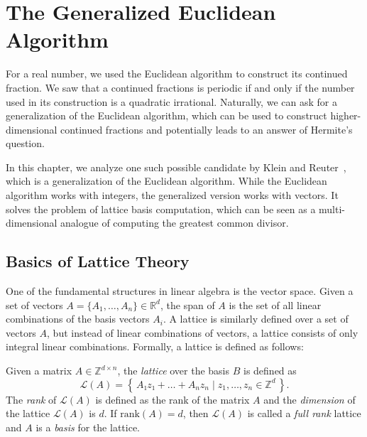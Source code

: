\chapter{The Generalized Euclidean Algorithm}

For a real number, we used the Euclidean algorithm to construct its continued
fraction.
We saw that a continued fractions is periodic if and only if the number used in
its construction is a quadratic irrational.
Naturally, we can ask for a generalization of the Euclidean algorithm,
which can be used to construct higher-dimensional continued fractions
and potentially leads to an answer of Hermite's question.

In this chapter, we analyze one such possible candidate by Klein and Reuter~\cite{Klein24},
which is a generalization of the Euclidean algorithm.
While the Euclidean algorithm works with integers,
the generalized version works with vectors.
It solves the problem of lattice basis computation,
which can be seen as a multi-dimensional analogue of computing the greatest
common divisor.

\section{Basics of Lattice Theory}

One of the fundamental structures in linear algebra is the vector space.
Given a set of vectors $A = \{A_1, …, A_n\} ∈ ℝ^d$, the span of $A$ is the set
of all linear combinations of the basis vectors $A_i$.
A lattice is similarly defined over a set of vectors $A$, but instead of linear
combinations of vectors, a lattice consists of only integral linear
combinations.
Formally, a lattice is defined as follows:

\begin{definition}
  Given a matrix $A ∈ ℤ^{d × n}$, the \emph{lattice} over the basis $B$ is defined as
  \[
    \mathcal{L}(A) = \left\{\, A₁z₁ + \dots + A_n z_n \mid z_1, \dots, z_n ∈ ℤ^d \,\right\}.
  \]
  The \emph{rank} of $\mathcal{L}(A)$ is defined as the rank of the matrix $A$
  and the \emph{dimension} of the lattice $\mathcal{L}(A)$ is $d$.
  If $\mathrm{rank}(A) = d$, then $\mathcal{L}(A)$ is called a \emph{full rank}
  lattice and $A$ is a \emph{basis} for the lattice.
\end{definition}

